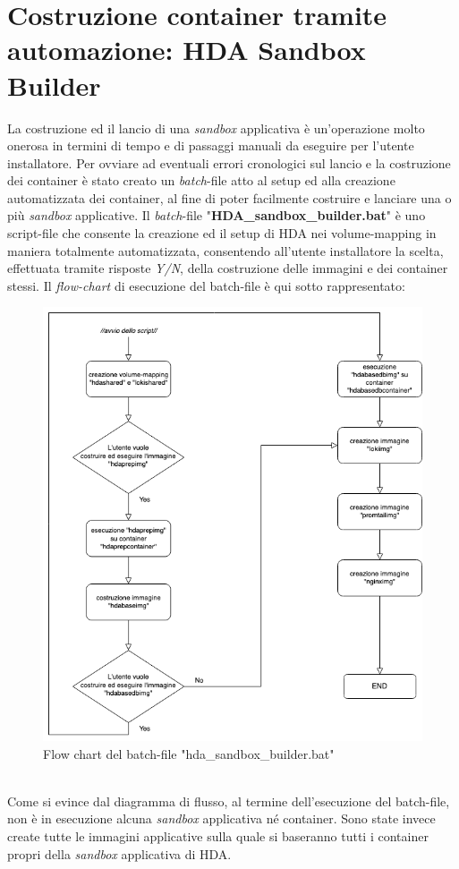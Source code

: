 \newpage
\section{Costruzione container tramite automazione: HDA Sandbox Builder}
La costruzione ed il lancio di una \textit{sandbox} applicativa è un'operazione molto onerosa in termini di tempo e di passaggi manuali da eseguire per l'utente installatore.
Per ovviare ad eventuali errori cronologici sul lancio e la costruzione dei container è stato creato un \textit{batch}-file atto al setup ed alla creazione automatizzata dei container, al fine di poter facilmente costruire e lanciare una o più \textit{sandbox} applicative.
Il \textit{batch}-file "\textbf{HDA\_sandbox\_builder.bat}" è uno script-file che consente la creazione ed il setup di HDA nei volume-mapping in maniera totalmente automatizzata, consentendo all'utente installatore la scelta, effettuata tramite risposte \textit{Y/N}, della costruzione delle immagini e dei container stessi.
Il \textit{flow-chart} di esecuzione del batch-file è qui sotto rappresentato:
\\
\begin{figure}[!h]     
\centering 
    \includegraphics[width=0.8 \columnwidth]{immagini/img/hda_sandbox_builder_fc} 
    \caption{Flow chart del batch-file "hda\_sandbox\_builder.bat"}
\end{figure}\\
Come si evince dal diagramma di flusso, al termine dell'esecuzione del batch-file, non è in esecuzione alcuna \textit{sandbox} applicativa né container. Sono state invece create tutte le immagini applicative sulla quale si baseranno tutti i container propri della \textit{sandbox} applicativa di HDA.
